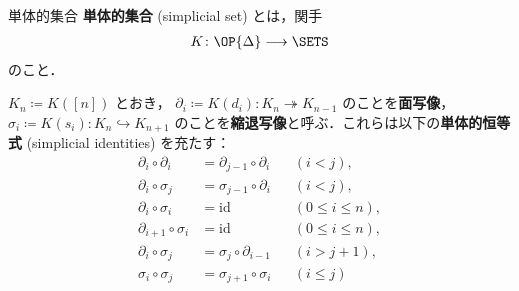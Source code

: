 \documentclass[TQFT_main]{subfiles}
\begin{document}
\begin{mydef}[label=def:simplicial-sets,breakable]{単体的集合}
    \textbf{単体的集合} (simplicial set)  とは，関手
    \begin{align}
        K \colon \OP{\Delta} \lto \SETS
    \end{align}
    のこと．

    \tcblower

    $K_n \coloneqq K([n])$ とおき，
    $\partial_i \coloneqq K(d_i) \colon K_{n} \twoheadrightarrow K_{n-1}$ のことを\textbf{面写像}，$\sigma_i \coloneqq K(s_i) \colon K_n \hookrightarrow K_{n+1}$ のことを\textbf{縮退写像}と呼ぶ．これらは以下の\textbf{単体的恒等式} (simplicial identities) を充たす：
    \begin{align}
        \partial_i \circ \partial_i &= \partial_{j-1} \circ \partial_i&& (i<j), \\
        \partial_i \circ \sigma_j &= \sigma_{j-1} \circ \partial_i && (i<j), \\
        \partial_i \circ \sigma_i &= \mathrm{id} &&(0\le i \le n), \\
        \partial_{i+1} \circ \sigma_i &= \mathrm{id} &&(0\le i \le n), \\
        \partial_i \circ \sigma_j &= \sigma_j \circ \partial_{i-1} &&(i > j+1), \\
        \sigma_i \circ \sigma_j &= \sigma_{j+1} \circ \sigma_i &&(i \le j)
    \end{align}
\end{mydef}
\end{document}
